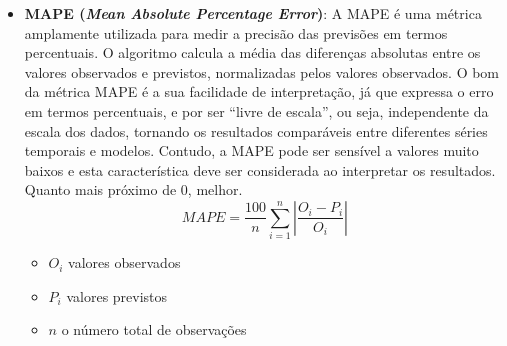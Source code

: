 \begin{itemize}
	\item \textbf{MAPE (\textit{Mean Absolute Percentage Error})}: A MAPE é uma métrica amplamente utilizada para medir a precisão das previsões em termos percentuais. O algoritmo calcula a média das diferenças absolutas entre os valores observados e previstos, normalizadas pelos valores observados. O bom da métrica MAPE é a sua facilidade de interpretação, já que expressa o erro em termos percentuais, e por ser ``livre de escala'', ou seja, independente da escala dos dados, tornando os resultados comparáveis entre diferentes séries temporais e modelos. Contudo, a MAPE pode ser sensível a valores muito baixos e esta característica deve ser considerada ao interpretar os resultados. Quanto mais próximo de 0, melhor.\cite{hyndman_fpp3_2024b}
	\begin{equation}
		MAPE = \frac{100}{n} \sum_{i=1}^{n} \left| \frac{O_i - P_i}{O_i} \right|
	\end{equation}
	\begin{itemize}
		\item $O_i$ valores observados
		\item $P_i$ valores previstos
		\item $n$ o número total de observações
	\end{itemize}
	
	

\end{itemize}
